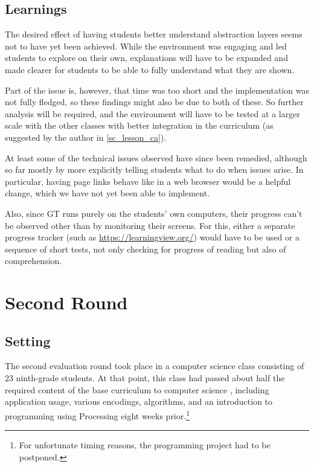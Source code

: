 \subsection{Learnings}

The desired effect of having students better understand abstraction layers seems not to have yet been achieved. While the environment was engaging and led students to explore on their own, explanations will have to be expanded and made clearer for students to be able to fully understand what they are shown.

Part of the issue is, however, that time was too short and the implementation was not fully fledged, so these findings might also be due to both of these. So further analysis will be required, and the environment will have to be tested at a larger scale with the other classes with better integration in the curriculum (as suggested by the author in \ref{sc_lesson_ca}).

At least some of the technical issues observed have since been remedied, although so far mostly by more explicitly telling students what to do when issues arise. In particular, having page links behave like in a web browser would be a helpful change, which we have not yet been able to implement.

Also, since \ac{GT} runs purely on the students' own computers, their progress can't be observed other than by monitoring their screens. For this, either a separate progress tracker (such as \url{https://learningview.org/}) would have to be used or a sequence of short tests, not only checking for progress of reading but also of comprehension.



\section{Second Round} \label{sc_validation_compiler} %

\subsection{Setting}

The second evaluation round took place in a computer science class consisting of 23 ninth-grade students. At that point, this class had passed about half the required content of the base curriculum to computer science \cite[p.\,145--146]{Erz16}, including application usage, various encodings, algorithms, and an introduction to programming using Processing eight weeks prior.\footnote{For unfortunate timing reasons, the programming project had to be postponed.}

